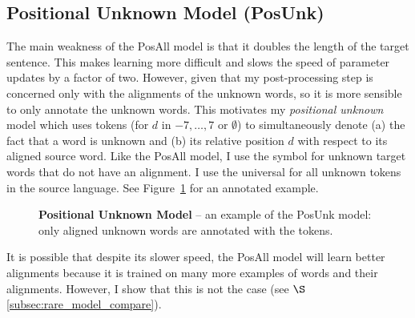 \subsection{Positional Unknown Model (PosUnk)}

The main weakness of the PosAll model is that it doubles the length of the target sentence. This
makes learning more difficult and slows the speed of parameter updates by a factor of two.
However, given that my post-processing step is concerned only with the alignments of the unknown words,
so it is more sensible to only annotate the unknown words. 
This motivates my {\it positional unknown} model which uses  
tokens (for $d$ in $-7,\ldots,7$ or $\emptyset$) to simultaneously 
denote (a) the fact that a word is unknown and (b) its relative position $d$ with respect to its aligned source word. 
Like the PosAll model, I use the symbol \unkpos{\emptyset} for unknown target words that do not have an alignment. 
I use the universal \unksym{} for all unknown tokens in the source language. See Figure~\ref{f:pos_unk} for an annotated example.

\begin{figure}[tbh!]
\caption[Positional Unknown Model]{ {\bf Positional Unknown Model} -- 
an example of the PosUnk model: only aligned unknown words are annotated with the  tokens.}
\label{f:pos_unk}
\end{figure}

It is possible that despite its slower speed, the PosAll model will learn better alignments because 
it is trained on many more examples of words and their alignments. 
However, I show that this is not the case (see $\S$\ref{subsec:rare_model_compare}).


